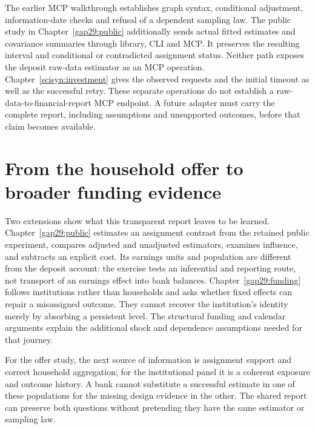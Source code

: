 The earlier MCP walkthrough establishes graph syntax, conditional
adjustment, information-date checks and refusal of a dependent sampling law.
The public study in Chapter~\ref{gap29:public} additionally sends actual
fitted estimates and covariance summaries through library, CLI and MCP.
It preserves the resulting interval and conditional or contradicted
assignment status. Neither path exposes the deposit raw-data estimator
as an MCP operation.
Chapter~\ref{scisyn:investment} gives the observed requests and the initial
timeout as well as the successful retry. These separate operations do not establish a raw-data-to-financial-report
MCP endpoint.
A future adapter must carry the complete report, including assumptions and
unsupported outcomes, before that claim becomes available.

\section{From the household offer to broader funding evidence}
Two extensions show what this transparent report leaves to be learned.
Chapter~\ref{gap29:public} estimates an assignment contrast from the retained
public experiment, compares adjusted and unadjusted estimators, examines
influence, and subtracts an explicit cost. Its earnings units and population
are different from the deposit account: the exercise tests an inferential
and reporting route, not transport of an earnings effect into bank balances.
Chapter~\ref{gap29:funding} follows institutions rather than households and
asks whether fixed effects can repair a misassigned outcome. They cannot
recover the institution's identity merely by absorbing a persistent level.
The structural funding and calendar arguments explain the additional shock
and dependence assumptions needed for that journey.

For the offer study, the next source of information is assignment support and
correct household aggregation; for the institutional panel it is a coherent
exposure and outcome history. A bank cannot substitute a successful estimate
in one of these populations for the missing design evidence in the other.
The shared report can preserve both questions without pretending they have
the same estimator or sampling law.


